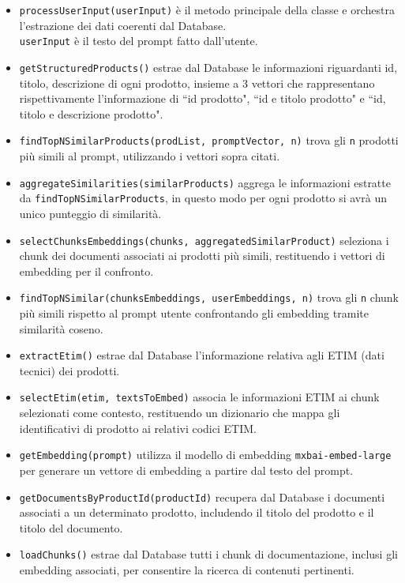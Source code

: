 \begin{itemize}
    \item \texttt{processUserInput(userInput)} \`e il metodo principale della classe e orchestra l'estrazione dei dati coerenti dal Database.\\ \texttt{userInput} \`e il testo del prompt fatto dall'utente.
    \item \texttt{getStructuredProducts()} estrae dal Database le informazioni riguardanti id, titolo, descrizione di ogni prodotto, insieme a 3 vettori che rappresentano rispettivamente l'informazione di ``id prodotto", ``id e titolo prodotto" e ``id, titolo e descrizione prodotto".
    \item \texttt{findTopNSimilarProducts(prodList, promptVector, n)} trova gli \texttt{n} prodotti pi\`u simili al prompt, utilizzando i vettori sopra citati.
    \item \texttt{aggregateSimilarities(similarProducts)} aggrega le informazioni estratte da \texttt{findTopNSimilarProducts}, in questo modo per ogni prodotto si avr\`a un unico punteggio di similarit\`a.
    \item \texttt{selectChunksEmbeddings(chunks, aggregatedSimilarProduct)} seleziona i chunk dei documenti associati ai prodotti pi\`u simili, restituendo i vettori di embedding per il confronto.
    \item \texttt{findTopNSimilar(chunksEmbeddings, userEmbeddings, n)} trova gli \texttt{n} chunk pi\`u simili rispetto al prompt utente confrontando gli embedding tramite similarit\`a coseno.
    \item \texttt{extractEtim()} estrae dal Database l'informazione relativa agli ETIM (dati tecnici) dei prodotti.
    \item \texttt{selectEtim(etim, textsToEmbed)} associa le informazioni ETIM ai chunk selezionati come contesto, restituendo un dizionario che mappa gli identificativi di prodotto ai relativi codici ETIM.
    \item \texttt{getEmbedding(prompt)} utilizza il modello di embedding \texttt{mxbai-embed-large} per generare un vettore di embedding a partire dal testo del prompt.
    \item \texttt{getDocumentsByProductId(productId)} recupera dal Database i documenti associati a un determinato prodotto, includendo il titolo del prodotto e il titolo del documento.
    \item \texttt{loadChunks()} estrae dal Database tutti i chunk di documentazione, inclusi gli embedding associati, per consentire la ricerca di contenuti pertinenti.
\end{itemize}

